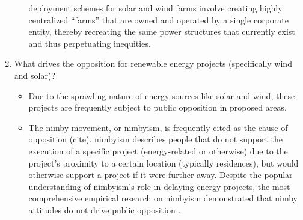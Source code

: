 \begin{enumerate}
\begin{itemize}
        deployment schemes for solar and wind farms involve creating highly centralized ``farms'' that are owned and operated
        by a single corporate entity, thereby recreating the same power structures that currently exist and thus perpetuating inequities.
    \end{itemize}
    \item What drives the opposition for renewable energy projects (specifically wind and solar)?
    \begin{itemize}
        \item Due to the sprawling nature of energy sources like solar and wind, these projects are frequently subject to 
        public opposition in proposed areas.
        \item The \ac{nimby} movement, or \acs{nimbyism}, is frequently cited as the cause of opposition (cite). \ac{nimbyism} describes
        people that do not support the execution of a specific project (energy-related or otherwise) due to the project's proximity
        to a certain location (typically residences), but would otherwise support a project if it were further away.
        Despite the popular understanding of \ac{nimbyism}'s role in delaying energy projects, the most comprehensive empirical 
        research on \ac{nimbyism} demonstrated that \ac{nimby} attitudes do not drive public opposition \cite{konisky_proximity_2021}. 
    \end{itemize}
\end{enumerate}